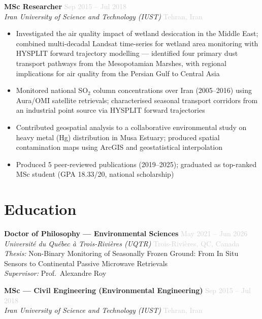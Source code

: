 \documentclass[10pt, a4paper]{article}
\newcommand{\dategray}[1]{\textcolor{lightgray}{\small #1}}
\newcommand{\jobtitle}[4]{%
  \noindent\textbf{#1} \hfill \dategray{#3} \\
  \textit{#2} \hfill \dategray{#4} \\[-4pt]
}
\begin{document}
\vspace{6pt}

\jobtitle{MSc Researcher}
         {Iran University of Science and Technology (IUST)}
         {Sep 2015 – Jul 2018}
         {Tehran, Iran}
\begin{itemize}
  \item Investigated the air quality impact of wetland desiccation in the
        Middle East; combined multi-decadal Landsat time-series for wetland
        area monitoring with HYSPLIT forward trajectory modelling --- identified
        four primary dust transport pathways from the Mesopotamian Marshes,
        with regional implications for air quality from the Persian Gulf to
        Central Asia
  \item Monitored national SO$_2$ column concentrations over Iran
        (2005--2016) using Aura/OMI satellite retrievals; characterised
        seasonal transport corridors from an industrial point source via
        HYSPLIT forward trajectories
  \item Contributed geospatial analysis to a collaborative environmental
        study on heavy metal (Hg) distribution in Musa Estuary; produced
        spatial contamination maps using ArcGIS and geostatistical
        interpolation
  \item Produced 5 peer-reviewed publications (2019--2025); graduated as
        top-ranked MSc student (GPA 18.33/20, national scholarship)
\end{itemize}

\section{Education}

\jobtitle{Doctor of Philosophy — Environmental Sciences}
         {Université du Québec à Trois-Rivières (UQTR)}
         {May 2021 – Jun 2026}
         {Trois-Rivières, QC, Canada}

\noindent\textit{Thesis:} Non-Binary Monitoring of Seasonally Frozen Ground:
From In Situ Sensors to Continental Passive Microwave Retrievals\\
\textit{Supervisor:} Prof.\ Alexandre Roy

\vspace{6pt}

\jobtitle{MSc — Civil Engineering (Environmental Engineering)}
         {Iran University of Science and Technology (IUST)}
         {Sep 2015 – Jul 2018}
         {Tehran, Iran}
\end{document}
